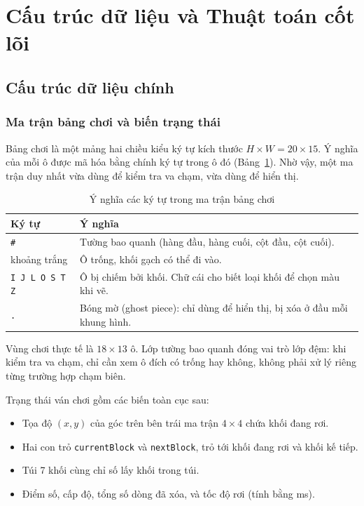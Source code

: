 \section{Cấu trúc dữ liệu và Thuật toán cốt lõi}

\subsection{Cấu trúc dữ liệu chính}

\subsubsection{Ma trận bảng chơi và biến trạng thái}

Bảng chơi là một mảng hai chiều kiểu ký tự kích thước $H \times W = 20 \times 15$. Ý nghĩa của mỗi ô được mã hóa bằng chính ký tự trong ô đó (Bảng~\ref{tab:ky_tu_bang_choi}). Nhờ vậy, một ma trận duy nhất vừa dùng để kiểm tra va chạm, vừa dùng để hiển thị.

\begin{table}[H]
    \centering
    \caption{Ý nghĩa các ký tự trong ma trận bảng chơi}
    \label{tab:ky_tu_bang_choi}
    \renewcommand{\arraystretch}{1.3}
    \begin{tabularx}{\textwidth}{|p{3.2cm}|X|}
        \hline
        \textbf{Ký tự} & \textbf{Ý nghĩa} \\
        \hline
        \texttt{\#} & Tường bao quanh (hàng đầu, hàng cuối, cột đầu, cột cuối). \\
        \hline
        khoảng trắng & Ô trống, khối gạch có thể đi vào. \\
        \hline
        \texttt{I J L O S T Z} & Ô bị chiếm bởi khối. Chữ cái cho biết loại khối để chọn màu khi vẽ. \\
        \hline
        \texttt{.} & Bóng mờ (ghost piece): chỉ dùng để hiển thị, bị xóa ở đầu mỗi khung hình. \\
        \hline
    \end{tabularx}
\end{table}

Vùng chơi thực tế là $18 \times 13$ ô. Lớp tường bao quanh đóng vai trò lớp đệm: khi kiểm tra va chạm, chỉ cần xem ô đích có trống hay không, không phải xử lý riêng từng trường hợp chạm biên.

Trạng thái ván chơi gồm các biến toàn cục sau:
\begin{itemize}
    \item Tọa độ $(x, y)$ của góc trên bên trái ma trận $4 \times 4$ chứa khối đang rơi.
    \item Hai con trỏ \texttt{currentBlock} và \texttt{nextBlock}, trỏ tới khối đang rơi và khối kế tiếp.
    \item Túi 7 khối cùng chỉ số lấy khối trong túi.
    \item Điểm số, cấp độ, tổng số dòng đã xóa, và tốc độ rơi (tính bằng ms).
\end{itemize}

